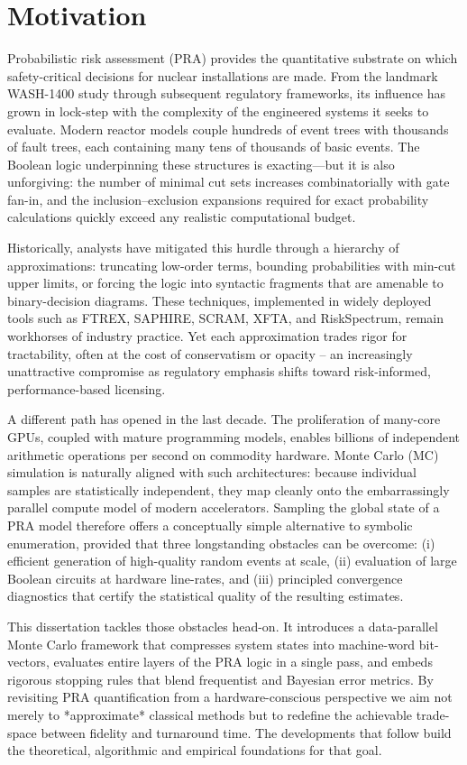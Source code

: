 \section{Motivation}
Probabilistic risk assessment (PRA) provides the quantitative substrate on which safety-critical decisions for nuclear installations are made.  From the landmark WASH-1400 study through subsequent regulatory frameworks, its influence has grown in lock-step with the complexity of the engineered systems it seeks to evaluate.  Modern reactor models couple hundreds of event trees with thousands of fault trees, each containing many tens of thousands of basic events.  The Boolean logic underpinning these structures is exacting—but it is also unforgiving: the number of minimal cut sets increases combinatorially with gate fan-in, and the inclusion–exclusion expansions required for exact probability calculations quickly exceed any realistic computational budget.

Historically, analysts have mitigated this hurdle through a hierarchy of approximations: truncating low-order terms, bounding probabilities with min-cut upper limits, or forcing the logic into syntactic fragments that are amenable to binary-decision diagrams.  These techniques, implemented in widely deployed tools such as FTREX, SAPHIRE, SCRAM, XFTA, and RiskSpectrum, remain workhorses of industry practice.  Yet each approximation trades rigor for tractability, often at the cost of conservatism or opacity -- an increasingly unattractive compromise as regulatory emphasis shifts toward risk-informed, performance-based licensing.

A different path has opened in the last decade.  The proliferation of many-core GPUs, coupled with mature programming models, enables billions of independent arithmetic operations per second on commodity hardware.  Monte Carlo (MC) simulation is naturally aligned with such architectures: because individual samples are statistically independent, they map cleanly onto the embarrassingly parallel compute model of modern accelerators.  Sampling the global state of a PRA model therefore offers a conceptually simple alternative to symbolic enumeration, provided that three longstanding obstacles can be overcome: (i) efficient generation of high-quality random events at scale, (ii) evaluation of large Boolean circuits at hardware line-rates, and (iii) principled convergence diagnostics that certify the statistical quality of the resulting estimates.

This dissertation tackles those obstacles head-on.  It introduces a data-parallel Monte Carlo framework that compresses system states into machine-word bit-vectors, evaluates entire layers of the PRA logic in a single pass, and embeds rigorous stopping rules that blend frequentist and Bayesian error metrics.  By revisiting PRA quantification from a hardware-conscious perspective we aim not merely to *approximate* classical methods but to redefine the achievable trade-space between fidelity and turnaround time.  The developments that follow build the theoretical, algorithmic and empirical foundations for that goal.

